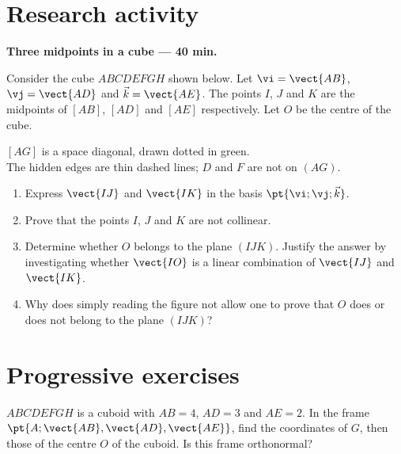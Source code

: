 \section{Research activity}\textbf{Three midpoints in a cube --- 40 min.}\par Consider the cube $ABCDEFGH$ shown below. Let $\vi=\vect{AB}$, $\vj=\vect{AD}$ and $\vec k=\vect{AE}$. The points $I$, $J$ and $K$ are the midpoints of $[AB]$, $[AD]$ and $[AE]$ respectively. Let $O$ be the centre of the cube.
\begin{center}\par\small $[AG]$ is a space diagonal, drawn dotted in green.\\The hidden edges are thin dashed lines; $D$ and $F$ are not on $(AG)$.\end{center}
\begin{enumerate}\item Express $\vect{IJ}$ and $\vect{IK}$ in the basis $\pt{\vi;\vj;\vec k}$.
\item Prove that the points $I$, $J$ and $K$ are not collinear.
\item Determine whether $O$ belongs to the plane $(IJK)$. Justify the answer by investigating whether $\vect{IO}$ is a linear combination of $\vect{IJ}$ and $\vect{IK}$.
\item Why does simply reading the figure not allow one to prove that $O$ does or does not belong to the plane $(IJK)$?\end{enumerate}

\mxnewpage
\section{Progressive exercises}

$ABCDEFGH$ is a cuboid with $AB=4$, $AD=3$ and $AE=2$. In the frame $\pt{A;\vect{AB},\vect{AD},\vect{AE}}$, find the coordinates of $G$, then those of the centre $O$ of the cuboid. Is this frame orthonormal?

